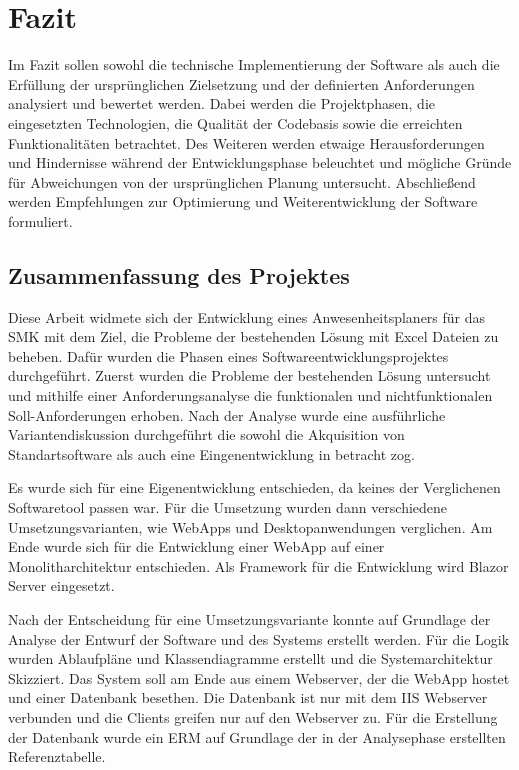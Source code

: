 \section{Fazit}
\label{sec:Fazit}
Im Fazit sollen sowohl die technische Implementierung der Software als auch die Erfüllung der ursprünglichen Zielsetzung und der definierten Anforderungen analysiert und bewertet werden. Dabei werden die Projektphasen, die eingesetzten Technologien, die Qualität der Codebasis sowie die erreichten Funktionalitäten betrachtet. Des Weiteren werden etwaige Herausforderungen und Hindernisse während der Entwicklungsphase beleuchtet und mögliche Gründe für Abweichungen von der ursprünglichen Planung untersucht. Abschließend werden Empfehlungen zur Optimierung und Weiterentwicklung der Software formuliert.

\subsection{Zusammenfassung des Projektes}
\label{sec:Zusammenfassung}
Diese Arbeit widmete sich der Entwicklung eines Anwesenheitsplaners für das SMK mit dem Ziel, die Probleme der bestehenden Lösung mit Excel Dateien zu beheben. Dafür wurden die Phasen eines Softwareentwicklungsprojektes durchgeführt. Zuerst wurden die Probleme der bestehenden Lösung untersucht und mithilfe einer Anforderungsanalyse die funktionalen und nichtfunktionalen Soll-Anforderungen erhoben. Nach der Analyse wurde eine ausführliche Variantendiskussion durchgeführt die sowohl die Akquisition von Standartsoftware als auch eine Eingenentwicklung in betracht zog.

Es wurde sich für eine Eigenentwicklung entschieden, da keines der Verglichenen Softwaretool passen war. Für die Umsetzung wurden dann verschiedene Umsetzungsvarianten, wie WebApps und Desktopanwendungen verglichen. Am Ende wurde sich für die Entwicklung einer WebApp auf einer Monolitharchitektur entschieden. Als Framework für die Entwicklung wird Blazor Server eingesetzt.

Nach der Entscheidung für eine Umsetzungsvariante konnte auf Grundlage der Analyse der Entwurf der Software und des Systems erstellt werden. Für die Logik wurden Ablaufpläne und Klassendiagramme erstellt und die Systemarchitektur Skizziert. Das System soll am Ende aus einem Webserver, der die WebApp hostet und einer Datenbank besethen. Die Datenbank ist nur mit dem IIS Webserver verbunden und die Clients greifen nur auf den Webserver zu. Für die Erstellung der Datenbank wurde ein ERM auf Grundlage der in der Analysephase erstellten Referenztabelle.

